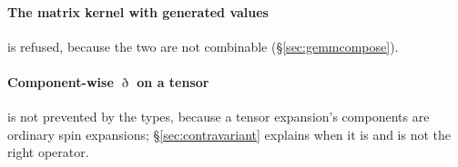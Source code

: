 \documentclass[11pt,a4paper]{article}
\begin{document}
\paragraph{The matrix kernel with generated values} is refused, because
the two are not combinable (\S\ref{sec:gemmcompose}).

\paragraph{Component-wise $\eth$ on a tensor} is not prevented by the
types, because a tensor expansion's components are ordinary spin
expansions; \S\ref{sec:contravariant} explains when it is and is not the
right operator.
\end{document}
